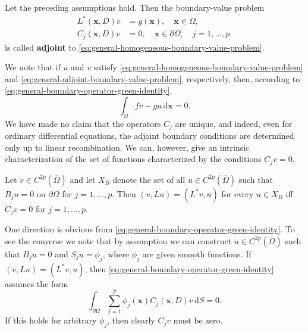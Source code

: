 \begin{Definition}
\label{def:adjoint-boundary-value-problem}
Let the preceding assumptions hold. Then the boundary-value problem
\begin{equation}\label{eq:general-adjoint-boundary-value-problem}
\begin{aligned}
L^*(\bm{x},D)v&=g(\bm{x}),\quad\bm{x}\in\Omega,\\
C_j(\bm{x},D)v&=0,\quad\bm{x}\in\partial\Omega,\quad j=1,\ldots,p.
\end{aligned}
\end{equation}
is called \textbf{adjoint} to \eqref{eq:general-homogeneous-boundary-value-problem}.
\end{Definition}

We note that if $u$ and $v$ satisfy \eqref{eq:general-homogeneous-boundary-value-problem} and \eqref{eq:general-adjoint-boundary-value-problem}, respectively, then, according to \eqref{eq:general-boundary-operator-green-identity},
\begin{equation}\label{eq:adjoint-solutions-forcing-orthogonality}
\int_\Omega fv-gu\,\mathrm{d}\bm{x}=0.
\end{equation}
We have made no claim that the operators $C_j$ are unique, and indeed, even for ordinary differential equations, the adjoint boundary conditions are determined only up to linear recombination. We can, however, give an intrinsic characterization of the set of functions characterized by the conditions $C_jv=0$.

\begin{Lemma}
\label{lem:adjoint-boundary-intrinsic-characterization}
Let $v\in C^{2p}(\overline\Omega)$ and let $X_B$ denote the set of all $u\in C^{2p}(\overline\Omega)$ such that $B_ju=0$ on $\partial\Omega$ for $j=1,\ldots,p$. Then $(v,Lu)=(L^*v,u)$ for every $u\in X_B$ iff $C_jv=0$ for $j=1,\ldots,p$.
\end{Lemma}

\begin{Proof}
One direction is obvious from \eqref{eq:general-boundary-operator-green-identity}. To see the converse we note that by assumption we can construct $u\in C^{2p}(\overline\Omega)$ such that $B_ju=0$ and $S_ju=\phi_j$, where $\phi_j$ are given smooth functions. If $(v,Lu)=(L^*v,u)$, then \eqref{eq:general-boundary-operator-green-identity} assumes the form
\begin{equation}\label{eq:adjoint-boundary-conditions-test-identity}
\int_{\partial\Omega}\sum_{j=1}^p\phi_j(\bm{x})C_j(\bm{x},D)v\,\mathrm{d}S=0.
\end{equation}
If this holds for arbitrary $\phi_j$, then clearly $C_jv$ must be zero.
\end{Proof}

